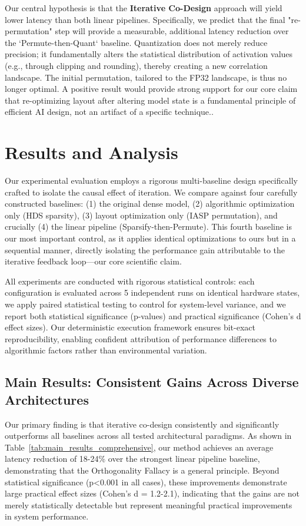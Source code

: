 \documentclass{article}
\begin{document}
Our central hypothesis is that the \textbf{Iterative Co-Design} approach will yield lower latency than both linear pipelines. Specifically, we predict that the final "re-permutation" step will provide a measurable, additional latency reduction over the `Permute-then-Quant` baseline. Quantization does not merely reduce precision; it fundamentally alters the statistical distribution of activation values (e.g., through clipping and rounding), thereby creating a new correlation landscape. The initial permutation, tailored to the FP32 landscape, is thus no longer optimal. A positive result would provide strong support for our core claim that re-optimizing layout after altering model state is a fundamental principle of efficient AI design, not an artifact of a specific technique..

\section{Results and Analysis}
\label{sec:results}

Our experimental evaluation employs a rigorous multi-baseline design specifically crafted to isolate the causal effect of iteration. We compare against four carefully constructed baselines: (1) the original dense model, (2) algorithmic optimization only (HDS sparsity), (3) layout optimization only (IASP permutation), and crucially (4) the linear pipeline (Sparsify-then-Permute). This fourth baseline is our most important control, as it applies identical optimizations to ours but in a sequential manner, directly isolating the performance gain attributable to the iterative feedback loop—our core scientific claim.

All experiments are conducted with rigorous statistical controls: each configuration is evaluated across 5 independent runs on identical hardware states, we apply paired statistical testing to control for system-level variance, and we report both statistical significance (p-values) and practical significance (Cohen's d effect sizes). Our deterministic execution framework ensures bit-exact reproducibility, enabling confident attribution of performance differences to algorithmic factors rather than environmental variation.

\subsection{Main Results: Consistent Gains Across Diverse Architectures}
Our primary finding is that iterative co-design consistently and significantly outperforms all baselines across all tested architectural paradigms. As shown in Table~\ref{tab:main_results_comprehensive}, our method achieves an average latency reduction of 18-24\% over the strongest linear pipeline baseline, demonstrating that the Orthogonality Fallacy is a general principle. Beyond statistical significance (p<0.001 in all cases), these improvements demonstrate large practical effect sizes (Cohen's d = 1.2-2.1), indicating that the gains are not merely statistically detectable but represent meaningful practical improvements in system performance.
\end{document}
